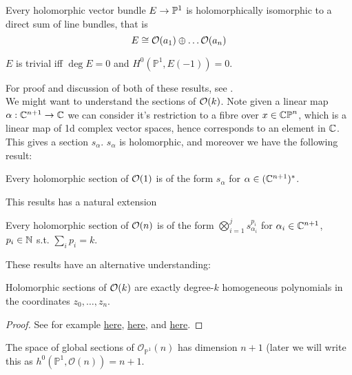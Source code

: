 \documentclass{article}
\begin{document}
\begin{theorem}
	Every holomorphic vector bundle $E \to \mathbb{P}^1$ is holomorphically isomorphic to a direct sum of line bundles, that is 
	\[
	E \cong \mathcal{O}(a_1) \oplus \dots \mathcal{O}(a_n)
	\]
\end{theorem}
\begin{corollary}
	$E$ is trivial iff $\deg E=0$ and $H^0(\mathbb{P}^1,E(-1))=0$. 
\end{corollary}
For proof and discussion of both of these results, see \cite{Hitchin2013}. \\
We might want to understand the sections of $\mathcal{O}(k)$. Note given a linear map $\alpha :\mathbb{C}^{n+1} \to \mathbb{C}$ we can consider it's restriction to a fibre over $x \in \mathbb{CP}^n$, which is a linear map of 1d complex vector spaces, hence corresponds to an element in $\mathbb{C}$. This gives a section $s_\alpha$. $s_\alpha$ is holomorphic, and moreover we have the following result:
\begin{prop}
	Every holomorphic section of $\mathcal{O}(1)$ is of the form $s_\alpha$ for $\alpha \in (\mathbb{C}^{n+1})^\ast$. 
\end{prop}  
This results has a natural extension 
\begin{prop}
	Every holomorphic section of $\mathcal{O}(n)$ is of the form $\bigotimes_{i=1}^j s_{\alpha_i}^{p_i}$ for $\alpha_i \in \mathbb{C}^{n+1}$, $p_i \in \mathbb{N}$ s.t. $\sum_i p_i = k$. 
\end{prop}
These results have an alternative understanding:
\begin{prop}
	Holomorphic sections of $\mathcal{O}(k)$ are exactly degree-$k$ homogeneous polynomials in the coordinates $z_0, \dots, z_n$. 
\end{prop}
\begin{proof}
	See for example \href{http://math.iisc.ac.in/~vamsipingali/teaching/AIS2019Lecture1.pdf}{here}, \href{https://math.stanford.edu/~vakil/725/class22.pdf}{here}, and \href{http://homepages.ulb.ac.be/~joelfine/preprints/Kahler_intro_ch2.pdf}{here}.
\end{proof}
\begin{corollary}\label{cor: h^0(P^1,O(n))=n+1}
	The space of global sections of $\mathcal{O}_{\mathbb{P}^1}(n)$ has dimension $n+1$ (later we will write this as $h^0(\mathbb{P}^1,\mathcal{O}(n))=n+1$.
\end{corollary}
\end{document}
